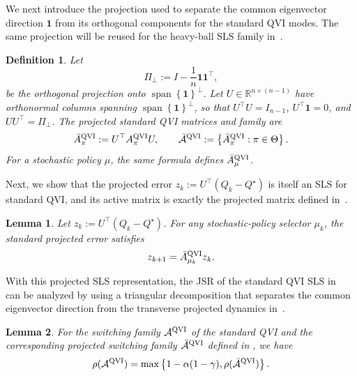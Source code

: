 \documentclass[letterpaper]{article}
\numberwithin{equation}{section}
\newtheorem{definition}{Definition}[section]
\newtheorem{lemma}{Lemma}[section]
\newcommand{\R}{\mathbb{R}}
\begin{document}
We next introduce the projection used to separate the common eigenvector
direction $\mathbf{1}$ from its orthogonal components for the standard QVI modes.
The same projection will be reused for the heavy-ball SLS family in~.
\begin{definition}
Let
\begin{equation}
  \Pi_\perp:=I-\frac{1}{n}\mathbf{1}\mathbf{1}^\top,
  \label{eq:orthogonal-projection}
\end{equation}
be the orthogonal projection onto $\operatorname{span}\left\{\mathbf{1}\right\}^\perp$. Let
$U\in\R^{n\times(n-1)}$ have orthonormal columns spanning
$\operatorname{span}\left\{\mathbf{1}\right\}^\perp$, so that $U^\top U=I_{n-1}$,
$U^\top\mathbf{1}=0$, and $UU^\top=\Pi_\perp$.
The projected standard QVI matrices and family are
\begin{equation}
  \bar A_\pi^{\rm QVI}:=U^\top A_\pi^{\rm QVI}U,
  \qquad
  \bar{\mathcal A}^{\rm QVI}:=\left\{\bar A_\pi^{\rm QVI}:\pi\in\Theta\right\}.
  \label{eq:projected-ql-family}
\end{equation}
For a stochastic policy $\mu$, the same formula defines $\bar A_\mu^{\rm QVI}$.
\end{definition}

Next, we show that the projected error $z_k:=U^\top(Q_k-Q^\star)$ is itself an SLS for standard QVI, and its active matrix is exactly the projected matrix defined in~.
\begin{lemma}
\label{lem:projected-error-systems}
Let $z_k:=U^\top(Q_k-Q^\star)$. For any stochastic-policy selector $\mu_k$, the
standard projected error satisfies
\begin{align*}
  z_{k+1}=\bar A_{\mu_k}^{\rm QVI}z_k.
\end{align*}
\end{lemma}


With this projected SLS representation, the JSR of the standard QVI SLS in~ can be analyzed by using a triangular decomposition that separates the common eigenvector direction from the transverse projected dynamics in~.
\begin{lemma}
\label{lem:qvi-common-eigenvector-projected-jsr-decomposition}
For the switching family $\mathcal A^{\rm QVI}$ of the standard QVI and the
corresponding projected switching family $\bar{\mathcal A}^{\rm QVI}$ defined in
, we have
\begin{equation*}
  \rho(\mathcal A^{\rm QVI})
  =
  \max\left\{1-\alpha(1-\gamma),\rho(\bar{\mathcal A}^{\rm QVI})\right\}.
\end{equation*}
\end{lemma}
\end{document}
